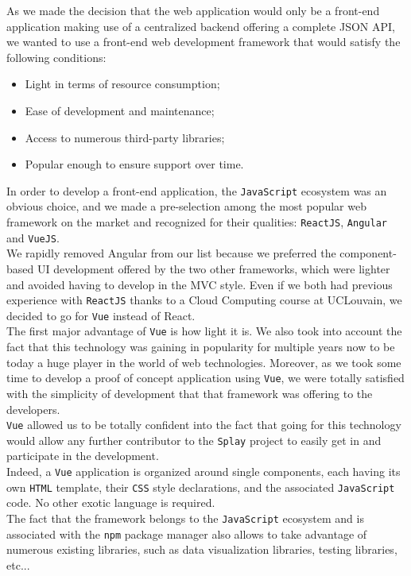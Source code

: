 \documentclass{eplmastersthesis}
\begin{document}
        As we made the decision that the web application would only be a
        front-end application making use of a centralized backend offering
        a complete JSON API, we wanted to use a front-end web development
        framework that would satisfy the following conditions: \\

        \begin{itemize}
          \item Light in terms of resource consumption;
          \item Ease of development and maintenance;
          \item Access to numerous third-party libraries;
          \item Popular enough to ensure support over time.
        \end{itemize}

        In order to develop a front-end application, the \texttt{JavaScript} ecosystem
        was an obvious choice, and we made a pre-selection among the most
        popular web framework on the market and recognized for their qualities:
        \texttt{ReactJS}, \texttt{Angular} and \texttt{VueJS}.\\
        We rapidly removed Angular from our list because we preferred the
        component-based UI development offered by the two other frameworks,
        which were lighter and avoided having to develop in the MVC style.
        Even if we both had previous experience with \texttt{ReactJS} thanks to a
        Cloud Computing course at UCLouvain, we decided to go for \texttt{Vue}
        instead of React.\\

        The first major advantage of \texttt{Vue} is how light it is. We also took into
        account the fact that this technology was gaining in popularity for
        multiple years now to be today a huge player in the world of web
        technologies. Moreover, as we took some time to develop a proof
        of concept application using \texttt{Vue}, we were totally satisfied with the
        simplicity of development that that framework was offering to the
        developers.\\
        \texttt{Vue} allowed us to be totally confident into the fact
        that going for this technology would allow any further contributor
        to the \texttt{Splay} project to easily get in and participate in the
        development.\\
        Indeed, a \texttt{Vue} application is organized around single components, each
        having its own \texttt{HTML} template, their \texttt{CSS} style declarations, and
        the associated \texttt{JavaScript} code. No other exotic language is required.\\
        The fact that the framework belongs to the \texttt{JavaScript} ecosystem and is
        associated with the \texttt{npm} package manager also allows to take advantage of
        numerous existing libraries, such as data visualization libraries,
        testing libraries, etc...\\
\end{document}
